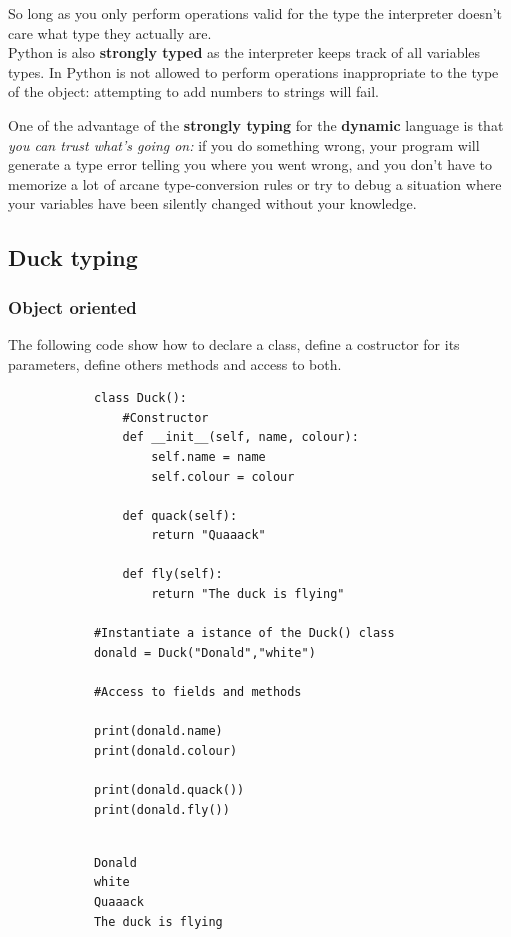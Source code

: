 \documentclass[12pt]{article}
\begin{document}
		So long as you only perform operations valid for the type the interpreter doesn't care what type they actually are. \\
		
		Python is also \textbf{strongly typed} as the interpreter keeps track of all variables types. In Python is not allowed to perform operations inappropriate to the type of the object: attempting to add numbers to strings will fail.
		
		One of the advantage of the \textbf{strongly typing} for the \textbf{dynamic} language is that \textit{you can trust what's going on:} if you do something wrong, your program will generate a type error telling you where you went wrong, and you don't have to memorize a lot of arcane type-conversion rules or try to debug a situation where your variables have been silently changed without your knowledge. 
		
	\subsection{Duck typing}
	
		\subsubsection{Object oriented}
		
		The following code show how to declare a class, define a costructor for its parameters, define others methods and access to both.
		
		\begin{lstlisting}
			class Duck():
				#Constructor 
				def __init__(self, name, colour):
					self.name = name
					self.colour = colour
				
				def quack(self):
					return "Quaaack"
				
				def fly(self):
					return "The duck is flying"
			
			#Instantiate a istance of the Duck() class
			donald = Duck("Donald","white")
			
			#Access to fields and methods
			
			print(donald.name)
			print(donald.colour)
			
			print(donald.quack())
			print(donald.fly())
			
		\end{lstlisting}
		
		\begin{lstlisting}
			Donald
			white
			Quaaack
			The duck is flying
		\end{lstlisting}
		
\end{document}
